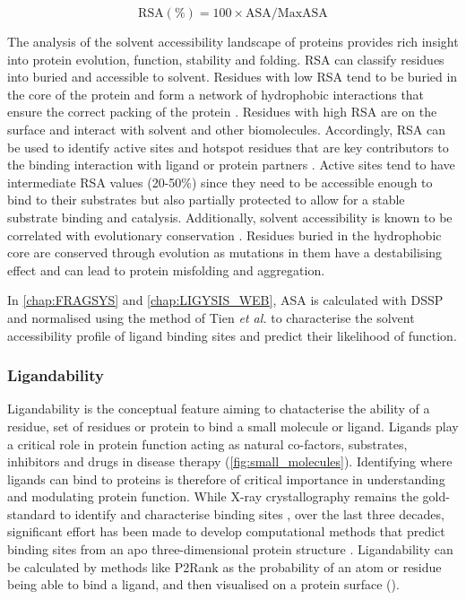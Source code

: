 \begin{equation}
\text{RSA} (\%) = 100 \times \text{ASA}/\text{MaxASA}
\label{eq:RSA}
\end{equation}

\vspace{-13pt} %

The analysis of the solvent accessibility landscape of proteins provides rich insight into protein evolution, function, stability and folding. RSA can classify residues into buried and accessible to solvent. Residues with low RSA tend to be buried in the core of the protein and form a network of hydrophobic interactions that ensure the correct packing of the protein \cite{DILL_1990_FOLDING}. Residues with high RSA are on the surface and interact with solvent and other biomolecules. Accordingly, RSA can be used to identify active sites and hotspot residues that are key contributors to the binding interaction with ligand or protein partners \cite{JONES_1997_PROTINTERS}. Active sites tend to have intermediate RSA values (20-50\%) since they need to be accessible enough to bind to their substrates but also partially protected to allow for a stable substrate binding and catalysis. Additionally, solvent accessibility is known to be correlated with evolutionary conservation \cite{GOLDMAN_1998_SS_RSA_EVO}. Residues buried in the hydrophobic core are conserved through evolution as mutations in them have a destabilising effect and can lead to protein misfolding and aggregation.

In \autoref{chap:FRAGSYS} and \autoref{chap:LIGYSIS_WEB}, ASA is calculated with DSSP \cite{KABSCH_1983_DSSP} and normalised using the method of Tien \textit{et al.} \cite{TIEN_2013_RSA} to characterise the solvent accessibility profile of ligand binding sites and predict their likelihood of function.

\subsubsection{Ligandability}

Ligandability is the conceptual feature aiming to chatacterise the ability of a residue, set of residues or protein to bind a small molecule or ligand. Ligands play a critical role in protein function acting as natural co-factors, substrates, inhibitors and drugs in disease therapy (\autoref{fig:small_molecules}). Identifying where ligands can bind to proteins is therefore of critical importance in understanding and modulating protein function. While X-ray crystallography remains the gold-standard to identify and characterise binding sites \cite{REES_2004_FBLD}, over the last three decades, significant effort has been made to develop computational methods that predict binding sites from an apo three-dimensional protein structure \cite{VOLKAMER_2010_TOPOLOGY}. Ligandability can be calculated by methods like P2Rank \cite{KRIVAK_2018_P2RANK} as the probability of an atom or residue being able to bind a ligand, and then visualised on a protein surface ().

